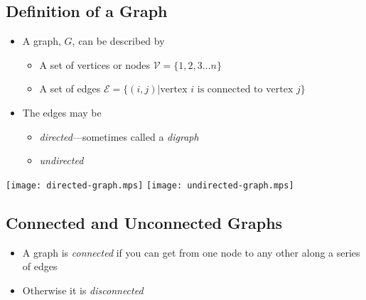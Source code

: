 
\begin{slide}
\section[-2]{Definition of a Graph}

\begin{PauseHighLight}
  \begin{itemize}\squeeze
  \item A graph, $G$, can be described by\pause
    \begin{itemize}
    \item A set of vertices or nodes $\mathcal{V} = \{1,2,3 \ldots
      n\}$\pause
    \item A set of edges $\mathcal{E} = \{(i,j)| \mbox{vertex $i$ is
    connected to vertex $j$} \}$\pause
    \end{itemize}
  \item The edges may be
    \begin{itemize}
    \item \emph{directed}---sometimes called a \emph{digraph}\pause
    \item \emph{undirected}\pause
    \end{itemize}
  \end{itemize}
  \begin{center}
    \texttt{[image: directed-graph.mps]}\hfil
    \pause
    \texttt{[image: undirected-graph.mps]}
    \pause
  \end{center}
\end{PauseHighLight}

\end{slide}


\begin{slide}
\section[-2]{Connected and Unconnected Graphs}


\begin{PauseHighLight}
  \begin{itemize}
  \item A graph is \emph{connected} if you can get from one node to any other
    along a series of edges\pause
  \item Otherwise it is \emph{disconnected}\pause
    \begin{center}
      \pause
    \end{center}
  \end{itemize}
\end{PauseHighLight}

\end{slide}

